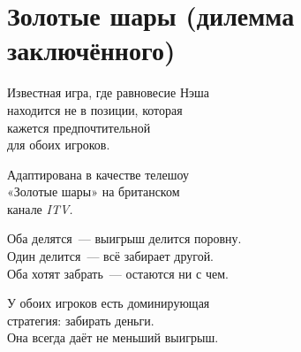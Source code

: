 \section{Золотые шары (дилемма заключённого)}

\begin{frame} 
	Известная игра, где равновесие Нэша\\
	находится не в позиции, которая\\
	кажется предпочтительной\\
	для обоих игроков.
	\medskip

	Адаптирована в качестве телешоу\\
	«Золотые шары» на британском\\
	канале {\it ITV.}
\end{frame}


\newcommand{\gbPO}{\gamePayoffs{5}{5}{0}{10}{10}{0}{0}{0}}


\begin{frame} 
	Оба делятся~— выигрыш делится поровну.\\
	Один делится~— всё забирает другой.\\
	Оба хотят забрать~— остаются ни с чем.
\begin{center}  \end{center}
\end{frame}


\begin{frame} 
	У обоих игроков есть доминирующая\\
	стратегия: забирать деньги.\\
	Она всегда даёт не меньший выигрыш.
\begin{center}  \end{center}
\end{frame}


